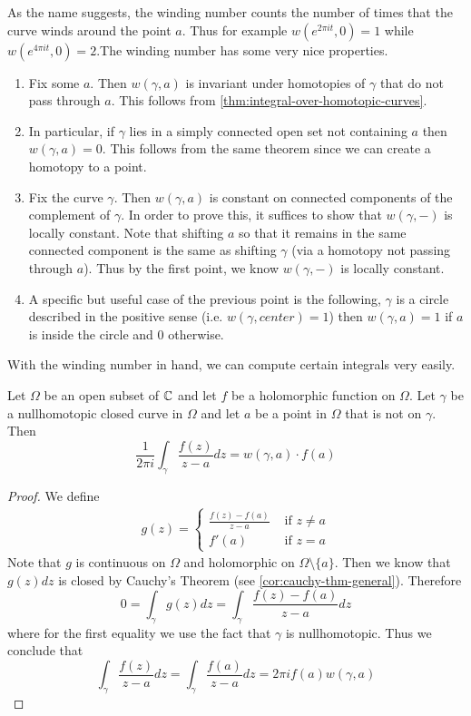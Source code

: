 As the name suggests, the winding number counts the number of times that the curve winds around the point $a$. Thus for example $w(e^{2\pi it}, 0) = 1$ while $w(e^{4\pi it}, 0) = 2$.The winding number has some very nice properties. 
\begin{enumerate}
    \item Fix some $a$. Then $w(\gamma, a)$ is invariant under homotopies of $\gamma$ that do not pass through $a$. This follows from \autoref{thm:integral-over-homotopic-curves}. 
    \item In particular, if $\gamma$ lies in a simply connected open set not containing $a$ then $w(\gamma, a) = 0$. This follows from the same theorem since we can create a homotopy to a point.
    \item Fix the curve $\gamma$. Then $w(\gamma, a)$ is constant on connected components of the complement of $\gamma$. In order to prove this, it suffices to show that $w(\gamma, -)$ is locally constant. Note that shifting $a$ so that it remains in the same connected component is the same as shifting $\gamma$ (via a homotopy not passing through $a$). Thus by the first point, we know $w(\gamma, -)$ is locally constant.
    \item A specific but useful case of the previous point is the following,  $\gamma$ is a circle described in the positive sense (i.e. $w(\gamma, center) = 1$) then $w(\gamma, a) = 1$ if $a$ is inside the circle and 0 otherwise.
\end{enumerate}
With the winding number in hand, we can compute certain integrals very easily.
\begin{theorem}
Let $\Omega$ be an open subset of $\mathbb{C}$ and let $f$ be a holomorphic function on $\Omega$. Let $\gamma$ be a nullhomotopic closed curve in $\Omega$ and let $a$ be a point in $\Omega$ that is not on $\gamma$. Then
$$ \frac{1}{2\pi i} \int_{\gamma} \frac{f(z)}{z - a}dz = w(\gamma, a) \cdot f(a) $$
\end{theorem}
\begin{proof}
    We define
    \begin{align*}
        g(z) = \begin{cases}
        \frac{f(z) - f(a)}{z - a} &\text{ if } z \neq a\\
        f'(a) &\text{ if } z = a
        \end{cases}
    \end{align*}
    Note that $g$ is continuous on $\Omega$ and holomorphic on $\Omega \setminus \{a\}$. Then we know that $g(z) dz$ is closed by Cauchy's Theorem (see \autoref{cor:cauchy-thm-general}). Therefore
    $$ 0 = \int_\gamma g(z) dz = \int_{\gamma} \frac{f(z) - f(a)}{z - a} dz $$
    where for the first equality we use the fact that $\gamma$ is nullhomotopic. Thus we conclude that
    $$ \int_{\gamma} \frac{f(z)}{z - a}dz = \int_\gamma \frac{f(a)}{z - a}dz = 2\pi i f(a) w(\gamma, a) $$
\end{proof}
